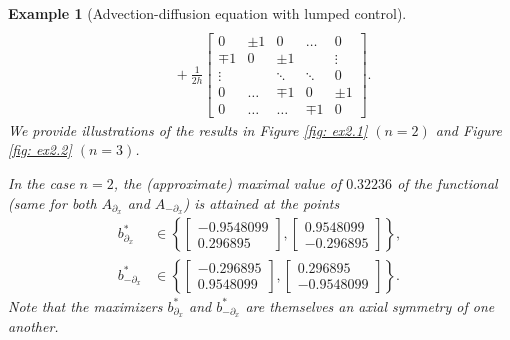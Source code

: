 \documentclass[journal,twoside,web]{ieeecolor}
\newcommand{\del}{\partial}
\newtheorem{example}{Example}
\begin{document}
\begin{example}[Advection-diffusion equation with lumped control]
\begin{align*}
			\\
		&\quad+ \frac{1}{2h} \begin{bmatrix} 0& \pm1& 0& \ldots& 0 \\ 
						     \mp1& 0& \pm1& & \vdots \\
						     \vdots&  &\ddots& \ddots& 0 \\
						     0& \ldots& \mp1 & 0 & \pm1 \\
						     0& \hdots &\hdots &\mp1 & 0  
				\end{bmatrix}.
	\end{align*}
	We provide illustrations of the results in Figure \ref{fig: ex2.1} $(n=2)$ and Figure \ref{fig: ex2.2} $(n=3)$.
	
	
	In the case $n=2$, the (approximate) maximal value of $0.32236$ of the functional (same for both $A_{\del_x}$ and $A_{-\del_x}$) is attained at the points 
	\begin{align} \label{eq: max.ex.2.1}
	b^*_{\del_x} &\in \left\{\begin{bmatrix}-0.9548099\\0.296895\end{bmatrix}, \begin{bmatrix}0.9548099\\-0.296895\end{bmatrix}\right\}, \nonumber\\
	b^*_{-\del_x} &\in \left\{\begin{bmatrix}-0.296895\\0.9548099\end{bmatrix}, \begin{bmatrix}0.296895\\-0.9548099\end{bmatrix}\right\}.
	\end{align}
	Note that the maximizers $b^*_{\del_x}$ and $b^*_{-\del_x}$ are themselves an axial symmetry of one another. 
	

\end{example}
\end{document}
